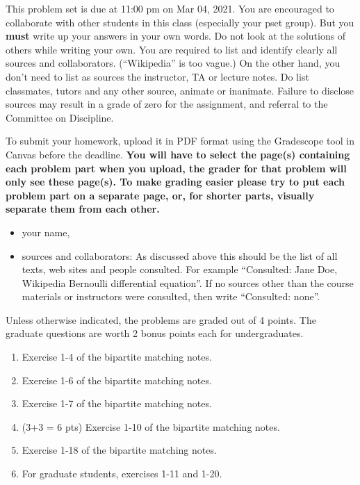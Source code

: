 \documentclass[12pt]{article} 
\begin{document}

\medskip
This problem set is due at 11:00 pm on Mar 04, 2021. You are encouraged to collaborate with other students in this class (especially your pset group). But you {\bf must} write up
your answers in your own words. Do not look at the solutions of others while writing your
own. You are required to list and identify clearly all sources and collaborators. (``Wikipedia''
is too vague.) On the other hand, you don't need to list as sources the instructor, TA or lecture notes. Do list classmates, tutors and any other
source, animate or inanimate.  Failure to disclose sources may result in a grade of zero for the assignment, and referral to the Committee on Discipline.  %

To submit your homework, upload it in PDF format using the Gradescope tool in Canvas before the deadline.
\textbf{You will have to select the page(s) containing each problem part when you upload, the grader
for that problem will only see these page(s). To make grading easier please try to put each problem part on a separate page, or, for shorter parts, visually separate them from each other.}
\begin{itemize}
\item your name,
\item sources and collaborators: As discussed above this should be the list of all texts, web
sites and people consulted. For example ``Consulted:
Jane Doe, Wikipedia Bernoulli differential equation''. If no sources other than the
course materials or instructors were consulted, then write ``Consulted: none''.
\end{itemize}
Unless otherwise indicated, the problems are graded out of 4 points. The graduate questions are worth 2 bonus points each for undergraduates.
\begin{enumerate}
\item 
Exercise 1-4 of the bipartite matching notes.
\item 
Exercise 1-6 of the bipartite matching notes.
\item 
Exercise 1-7 of the bipartite matching notes.
\item 
(3+3 = 6 pts) Exercise 1-10 of the bipartite matching notes. 
\item
Exercise 1-18 of the bipartite matching notes. 
\item
For graduate students, exercises 1-11 and 1-20.
\end{enumerate}
\end{document}
